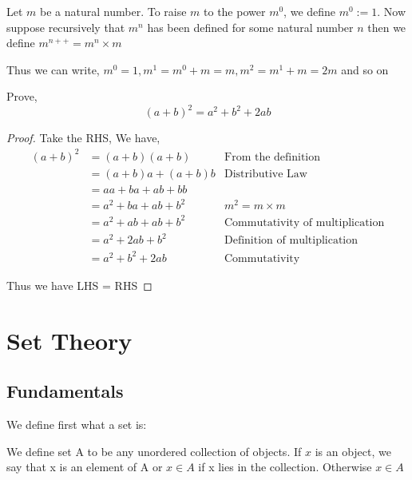 \documentclass[11pt]{report}
\begin{document}
\begin{definition}
	Let $m$ be a natural number. To raise $m$ to the power $m^0$, we define $m^0 := 1$. Now suppose recursively that $m^n $ has been defined for some natural number $n$ then we define $m^{n++} = m^n \times m$
\end{definition}
Thus we can write, $m^0 = 1, m^1 = m^0+m = m, m^2 = m^1 + m = 2m$ and so on
\begin{prop}
	Prove,
	\[
		(a + b)^2 = a^2 + b^2 + 2ab
	\]
\end{prop}
\begin{proof}
	Take the RHS,
	We have,
	\begin{align*}
		(a+b)^2 & = (a+b)(a+b)          & \text{From the definition}             \\
		        & = (a+b)a + (a+b)b     & \text{Distributive Law}                \\
		        & = aa + ba + ab + bb   &                                        \\
		        & = a^2 + ba + ab + b^2 & \text{$m^2 = m \times m$}              \\
		        & = a^2 + ab + ab + b^2 & \text{Commutativity of multiplication} \\
		        & = a^2 + 2ab + b^2     & \text{Definition of multiplication}    \\
		        & = a^2 +  b^2 + 2ab    & \text{Commutativity}
	\end{align*}

	Thus we have LHS = RHS
\end{proof}


\chapter{Set Theory}
\section{Fundamentals}
We define first what a set is:
\begin{definition}[Sets]
	We define set A to be any unordered collection of objects. If $x$ is an object, we say that x is an element of A or $x \in A$ if x lies in the collection. Otherwise $x \in A$
\end{definition}
\end{document}
